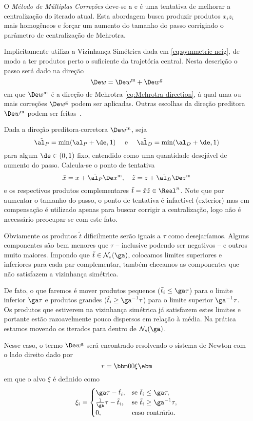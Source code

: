 O \emph{Método de Múltiplas Correções} deve-se a
\textcite{Gondzio:1996uw} e é uma tentativa de melhorar a centralização do iterado
atual. Esta abordagem busca produzir produtos $x_iz_i$ mais homogêneos e forçar
um aumento do tamanho do passo corrigindo o parâmetro de centralização de
Mehrotra.

Implicitamente \textcite{Gondzio:1996uw} utiliza a Vizinhança Simétrica dada 
em \eqref{eq:symmetric-neig}, de modo a ter produtos perto o suficiente da
trajetória central. Nesta descrição o passo será dado na direção
\[
\Dew = 	\DeMew + \DeMuw
\]
em que $\DeMew$ é a direção de Mehrotra \eqref{eq:Mehrotra-direction}, à qual
uma ou mais correções $\DeMuw$ podem ser aplicadas. Outras escolhas da direção preditora 
$\DeMew$ podem ser
feitas~\cite{Colombo:2008ia}.

Dada a direção preditora-corretora $\DeMew$, seja \[ \tilde{\al_P} =
\min(\al_P+\de, 1) \quad\text{ e }\quad\tilde{\al_D} = \min(\al_D+\de, 1) \]
para algum $\de\in(0,1)$ fixo, entendido como uma quantidade desejável de
aumento do passo. Calcula-se o ponto de tentativa \[
\tilde{x} = x +  \tilde{\al_P} \DeMex,\quad\tilde{z} = z +  \tilde{\al_D}
\DeMez \] e os respectivos produtos complementares $\tilde{t} =
\tilde{x}\tilde{z}\in\Real^n$. Note que por aumentar o tamanho do passo, o
ponto de tentativa é infactível (exterior) mas em compensação é utilizado apenas
para buscar corrigir a centralização,  logo não é necessário preocupar-se
com este fato.

Obviamente os produtos $\tilde{t}$ dificilmente serão iguais a $\tau$ como
desejaríamos. Alguns componentes são bem menores que $\tau$ -- inclusive
podendo ser negativos -- e outros muito maiores. Impondo que
$\tilde{t}\in\Nset_s(\ga)$, colocamos limites superiores e inferiores para cada
par complementar, também checamos as componentes que não satisfazem a
vizinhança simétrica. 

De fato, o que faremos é  mover produtos pequenos
($\tilde{t}_i\leq \ga\tau$) para o limite inferior $\ga\tau$ e produtos grandes
($\tilde{t}_i\geq \ga^{-1}\tau$) para o limite superior $\ga^{-1}\tau$. Os
produtos que estiverem na vizinhança simétrica já satisfazem estes limites e
portante estão razoavelmente pouco dispersos em relação à média. Na prática
estamos movendo os iterados para dentro de $\Nset_s(\ga)$.


Nesse caso, o termo $\DeMuw$ será encontrado resolvendo o sistema de Newton
com o lado direito dado por
\begin{equation}
\label{eq:multiply-correctors-rhs}
r = \bbm 0\\ 0\\ \xi\ebm
\end{equation}
em que o alvo $\xi$ é definido como
\[
\xi_i = 
\begin{cases}
\ga\tau - \tilde{t}_i, & \text{se } \tilde{t}_i\leq \ga\tau,\\
\frac{1}{\ga}\tau -
\tilde{t}_i, & \text{se } \tilde{t}_i\geq \ga^{-1}\tau,\\ 
0, & \text{caso contrário}.
\end{cases}
\]

